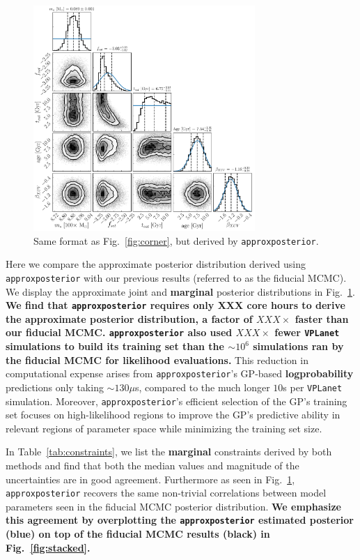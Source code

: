 \documentclass[twocolumn]{aastex62}
\newcommand{\xxx}[1]{{\textbf{#1}}}
\newcommand{\vplanet}[0]{\texttt{VPLanet}\xspace}
\newcommand{\approxposterior}[0]{\texttt{approxposterior}\xspace}
\begin{document}
\begin{figure}[t]
\centering
	\includegraphics[width=0.75\textwidth]{../Analysis/Approx/apCorner.pdf}
   \caption{Same format as Fig.~\ref{fig:corner}, but derived by \approxposterior.}%
    \label{fig:approx}%
\end{figure}

Here we compare the approximate posterior distribution derived using \approxposterior with our previous results (referred to as the fiducial MCMC). We display the approximate joint and \xxx{marginal} posterior distributions in Fig.~\ref{fig:approx}. \xxx{We find that \approxposterior requires only XXX core hours to derive the approximate posterior distribution, a factor of $XXX\times$ faster than our fiducial MCMC. \approxposterior also used $XXX\times$ fewer \vplanet simulations to build its training set than the ${\sim}10^6$ simulations ran by the fiducial MCMC for likelihood evaluations.} This reduction in computational expense arises from \approxposterior's GP-based \xxx{logprobability} predictions only taking ${\sim}130\mu$s, compared to the much longer $10$s per \vplanet simulation. Moreover, \approxposterior's efficient selection of the GP's training set focuses on high-likelihood regions to improve the GP's predictive ability in relevant regions of parameter space while minimizing the training set size. 

In Table~\ref{tab:constraints}, we list the \xxx{marginal} constraints derived by both methods and find that both the median values and magnitude of the uncertainties are in good agreement. Furthermore as seen in Fig.~\ref{fig:approx}, \approxposterior recovers the same non-trivial correlations between model parameters seen in the fiducial MCMC posterior distribution. \xxx{We emphasize this agreement by overplotting the \approxposterior estimated posterior (blue) on top of the fiducial MCMC results (black) in Fig.~\ref{fig:stacked}.}
\end{document}
